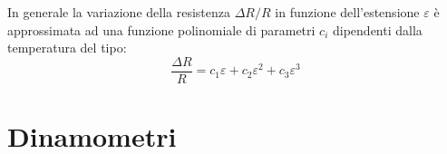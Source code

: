 		In generale la variazione della resistenza $\Delta R/R$ in funzione dell'estensione $\varepsilon$ è approssimata ad una funzione polinomiale di parametri $c_i$ dipendenti dalla temperatura del tipo:
		\[ \frac{\Delta R}{R} = c_1\varepsilon + c_2 \varepsilon^2 + c_3 \varepsilon^3  \]
		
\section{Dinamometri}
		
		
		
		
		
		
		
		
		
		
		
		
		
		
		
		
		
		
		
		
		
		
		
		
		
		
		
		
		
